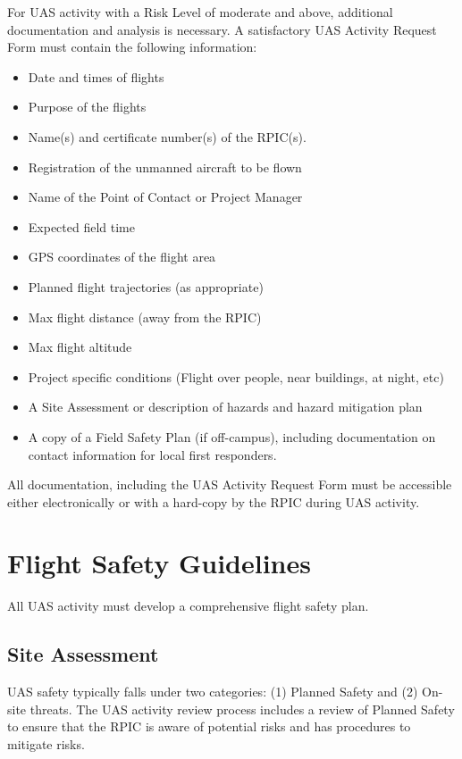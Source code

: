\documentclass[
]{book}
\providecommand{\tightlist}{%
  \setlength{\itemsep}{0pt}\setlength{\parskip}{0pt}}
\begin{document}
For UAS activity with a Risk Level of moderate and above, additional documentation and analysis is necessary. A satisfactory UAS Activity Request Form must contain the following information:

\begin{itemize}
\tightlist
\item
  Date and times of flights
\item
  Purpose of the flights
\item
  Name(s) and certificate number(s) of the RPIC(s).
\item
  Registration of the unmanned aircraft to be flown
\item
  Name of the Point of Contact or Project Manager
\item
  Expected field time
\item
  GPS coordinates of the flight area
\item
  Planned flight trajectories (as appropriate)
\item
  Max flight distance (away from the RPIC)
\item
  Max flight altitude
\item
  Project specific conditions (Flight over people, near buildings, at night, etc)
\item
  A Site Assessment or description of hazards and hazard mitigation plan
\item
  A copy of a Field Safety Plan (if off-campus), including documentation on contact information for local first responders.
\end{itemize}

All documentation, including the UAS Activity Request Form must be accessible either electronically or with a hard-copy by the RPIC during UAS activity.

\hypertarget{ch-flight-safety}{%
\chapter{Flight Safety Guidelines}\label{ch-flight-safety}}

All UAS activity must develop a comprehensive flight safety plan.

\hypertarget{site-assessment}{%
\section{Site Assessment}\label{site-assessment}}

UAS safety typically falls under two categories: (1) Planned Safety and (2) On-site threats. The UAS activity review process includes a review of Planned Safety to ensure that the RPIC is aware of potential risks and has procedures to mitigate risks.
\end{document}
